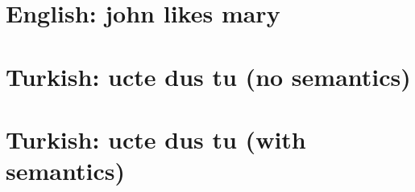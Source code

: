 \documentclass{article}
\begin{document}
\section*{English: john likes mary}

\bigskip
\section*{Turkish: ucte dus tu (no semantics)}

\bigskip
\section*{Turkish: ucte dus tu (with semantics)}
\end{document}
